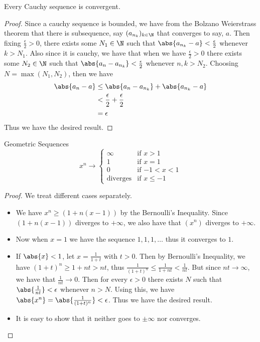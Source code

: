 \begin{prp}{}{} Every Cauchy sequence is convergent. \tcbline
\begin{proof} Since a cauchy sequence is bounded, we have from the Bolzano Weierstrass theorem that there is subsequence, say $(a_{n_k})_{k\in\N}$ that converges to say, $a$. Then fixing $\frac{\epsilon}{2}>0$, there exists some $N_1\in\N$ such that $\abs{a_{n_k}-a}<\frac{\epsilon}{2}$ whenever $k>N_1$. Also since it is cauchy, we have that when we have $\frac{\epsilon}{2}>0$ there exists some $N_2\in\N$ such that $\abs{a_n-a_{n_k}}<\frac{\epsilon}{2}$ whenever $n,k>N_2$. Choosing $N=\max{(N_1,N_2)}$, then we have 
\begin{align*}
\abs{a_n-a}&\leq\abs{a_n-a_{n_k}}+\abs{a_{n_k}-a} \\
&<\frac{\epsilon}{2}+\frac{\epsilon}{2} \\
&=\epsilon
\end{align*}
Thus we have the desired result. 
\end{proof}
\end{prp}

\begin{thm}{Geometric Sequences}{} $$x^n\to\begin{cases}
\infty & \text{if $x>1$} \\
1 & \text{if $x=1$} \\
0 & \text{if $-1<x<1$} \\
\text{diverges} & \text{if $x\leq-1$}
\end{cases}$$\tcbline
\begin{proof} We treat different cases separately. 
\begin{itemize}
\item We have $x^n\geq(1+n(x-1))$ by the Bernoulli's Inequality. Since $(1+n(x-1))$ diverges to $+\infty$, we also have that $(x^n)$ diverges to $+\infty$. 
\item Now when $x=1$ we have the sequence $1,1,1,\dots$ thus it converges to $1$. 
\item If $\abs{x}<1$, let $x=\frac{1}{1+t}$ with $t>0$. Then by Bernoulli's Inequality, we have $(1+t)^n\geq1+nt>nt$, thus $\frac{1}{(1+t)^n}\leq\frac{1}{1+nt}<\frac{1}{nt}$. But since $nt\to\infty$, we have that $\frac{1}{nt}\to 0$. Then for every $\epsilon>0$ there exists $N$ such that $\abs{\frac{1}{nt}}<\epsilon$ whenever $n>N$. Using this, we have $\abs{x^n}=\abs{\frac{1}{(1+t)^n}}<\epsilon$. Thus we have the desired result. 
\item It is easy to show that it neither goes to $\pm\infty$ nor converges. 
\end{itemize}
\end{proof}
\end{thm}

